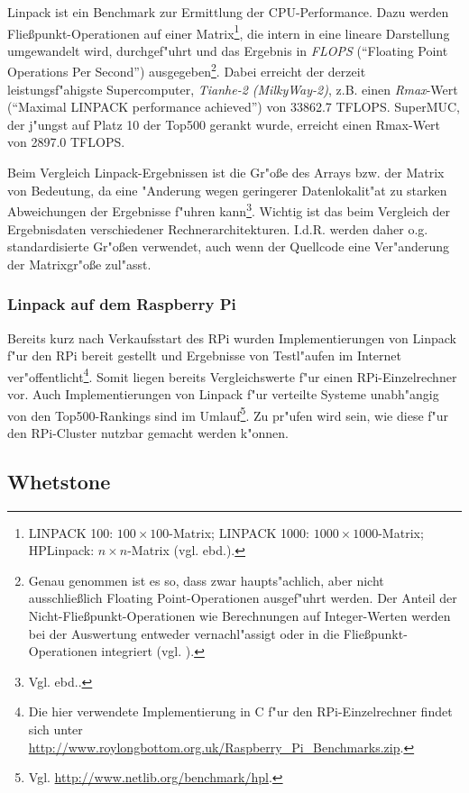 Linpack ist ein Benchmark zur Ermittlung der CPU-Performance. Dazu werden Flie\ss punkt-Operationen auf einer Matrix\footnote{LINPACK 100: $100 \times 100$-Matrix; LINPACK 1000: $1000\times 1000$-Matrix; HPLinpack: $n\times n$-Matrix (vgl. ebd.).}, die intern in eine lineare Darstellung umgewandelt wird, durchgef"uhrt und das Ergebnis in \textit{FLOPS} ("`Floating Point Operations Per Second"') ausgegeben\footnote{Genau genommen ist es so, dass zwar haupts"achlich, aber nicht ausschlie\ss lich Floating Point-Operationen ausgef"uhrt werden. Der Anteil der Nicht-Flie\ss punkt-Operationen wie Berechnungen auf Integer-Werten werden bei der Auswertung entweder vernachl"assigt oder in die Flie\ss punkt-Operationen integriert (vgl. \cite{wei90}).}. Dabei erreicht der derzeit leistungsf"ahigste Supercomputer, \textit{Tianhe-2 (Milky\-Way-2)}, z.B. einen \textit{Rmax}-Wert ("`Maximal LINPACK performance achieved"') von 33862.7 TFLOPS. SuperMUC, der j"ungst auf Platz 10 der Top500 gerankt wurde, erreicht einen Rmax-Wert von 2897.0 TFLOPS.

Beim Vergleich Linpack-Ergebnissen ist die Gr"o\ss e des Arrays bzw. der Matrix von Bedeutung, da eine "Anderung wegen geringerer Datenlokalit"at zu starken Abweichungen der Ergebnisse f"uhren kann\footnote{Vgl. ebd..}. Wichtig ist das beim Vergleich der Ergebnisdaten verschiedener Rechnerarchitekturen. I.d.R. werden daher o.g. standardisierte Gr"o\ss en verwendet, auch wenn der Quellcode eine Ver"anderung der Matrixgr"o\ss e zul"asst. 

\subsubsection{Linpack auf dem Raspberry Pi}\label{Linpack RPi}

Bereits kurz nach Verkaufsstart des RPi wurden Implementierungen von Linpack f"ur den RPi bereit gestellt und Ergebnisse von Testl"aufen im Internet ver"offentlicht\footnote{Die hier verwendete Implementierung in C f"ur den RPi-Einzelrechner findet sich unter \url{http://www.roylongbottom.org.uk/Raspberry_Pi_Benchmarks.zip}.}. Somit liegen bereits Vergleichswerte f"ur einen RPi-Einzelrechner vor. Auch Implementierungen von Linpack f"ur verteilte Systeme unabh"angig von den Top500-Rankings sind im Umlauf\footnote{Vgl. \url{http://www.netlib.org/benchmark/hpl}.}. Zu pr"ufen wird sein, wie diese f"ur den RPi-Cluster nutzbar gemacht werden k"onnen. 

\subsection{Whetstone}\label{Whetstone}

